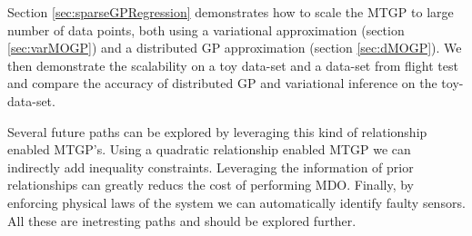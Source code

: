 Section \ref{sec:sparseGPRegression} demonstrates how to scale the MTGP to large number of data points, both using a variational approximation (section \ref{sec:varMOGP}) and a distributed GP approximation (section \ref{sec:dMOGP}). We then demonstrate the scalability on a toy data-set and a data-set from flight test and compare the accuracy of distributed GP and variational inference on the toy-data-set. 

Several future paths can be explored by leveraging this kind of relationship enabled MTGP's. Using a quadratic relationship enabled MTGP we can indirectly add inequality constraints. Leveraging the information of prior relationships can greatly reducs the cost of performing MDO. Finally, by enforcing physical laws of the system we can automatically identify faulty sensors. All these are inetresting paths and should be explored further. 


